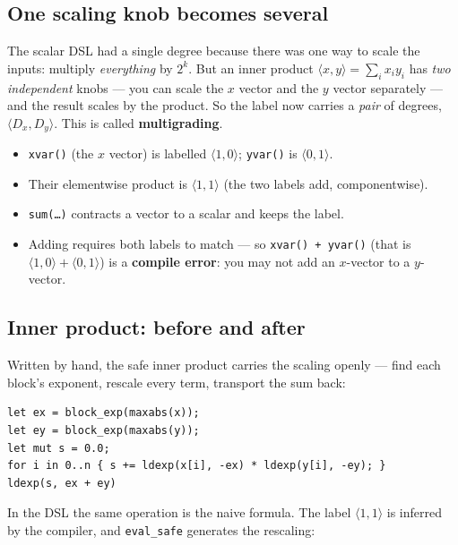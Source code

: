\documentclass[11pt]{article}
\newcommand{\code}[1]{\texttt{#1}}
\begin{document}
\subsection{One scaling knob becomes several}

The scalar DSL had a single degree because there was one way to scale the inputs:
multiply \emph{everything} by $2^{k}$. But an inner product
$\langle x, y\rangle = \sum_i x_i y_i$ has \emph{two independent} knobs --- you
can scale the $x$ vector and the $y$ vector separately --- and the result scales
by the product. So the label now carries a \emph{pair} of degrees,
$\langle D_x, D_y\rangle$. This is called \textbf{multigrading}.

\begin{itemize}[leftmargin=1.4em]
  \item \code{xvar()} (the $x$ vector) is labelled $\langle 1, 0\rangle$;
  \code{yvar()} is $\langle 0, 1\rangle$.
  \item Their elementwise product is $\langle 1, 1\rangle$ (the two labels add,
  componentwise).
  \item \code{sum(\ldots)} contracts a vector to a scalar and keeps the label.
  \item Adding requires both labels to match --- so \code{xvar() + yvar()}
  (that is $\langle 1,0\rangle + \langle 0,1\rangle$) is a \textbf{compile
  error}: you may not add an $x$-vector to a $y$-vector.
\end{itemize}

\subsection{Inner product: before and after}

Written by hand, the safe inner product carries the scaling openly --- find each
block's exponent, rescale every term, transport the sum back:

\begin{center}
\begin{BVerbatim}
let ex = block_exp(maxabs(x));
let ey = block_exp(maxabs(y));
let mut s = 0.0;
for i in 0..n { s += ldexp(x[i], -ex) * ldexp(y[i], -ey); }
ldexp(s, ex + ey)
\end{BVerbatim}
\end{center}

In the DSL the same operation is the naive formula. The label
$\langle 1,1\rangle$ is inferred by the compiler, and \code{eval\_safe} generates
the rescaling:
\end{document}

